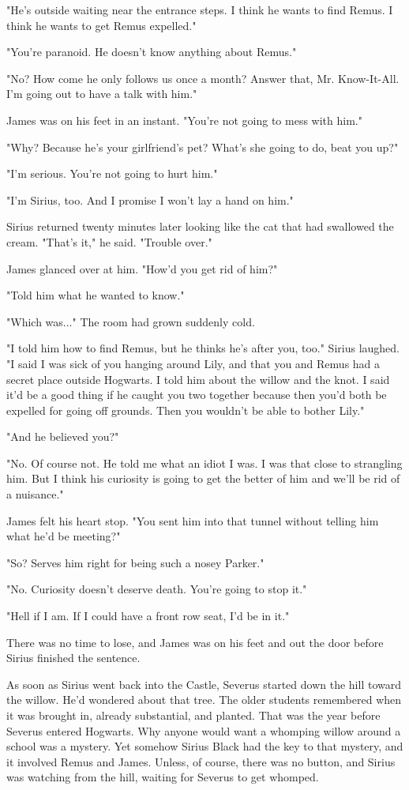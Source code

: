 \documentclass[a4paper,11pt]{article}
\begin{document}
"He's outside waiting near the entrance steps. I think he wants to find Remus. I think he wants to get Remus expelled."

"You're paranoid. He doesn't know anything about Remus."

"No? How come he only follows us once a month? Answer that, Mr. Know-It-All. I'm going out to have a talk with him."

James was on his feet in an instant. "You're not going to mess with him."

"Why? Because he's your girlfriend's pet? What's she going to do, beat you up?"

"I'm serious. You're not going to hurt him."

"I'm Sirius, too. And I promise I won't lay a hand on him."

Sirius returned twenty minutes later looking like the cat that had swallowed the cream. "That's it," he said. "Trouble over."

James glanced over at him. "How'd you get rid of him?"

"Told him what he wanted to know."

"Which was..." The room had grown suddenly cold.

"I told him how to find Remus, but he thinks he's after you, too." Sirius laughed. "I said I was sick of you hanging around Lily, and that you and Remus had a secret place outside Hogwarts. I told him about the willow and the knot. I said it'd be a good thing if he caught you two together because then you'd both be expelled for going off grounds. Then you wouldn't be able to bother Lily."

"And he believed you?"

"No. Of course not. He told me what an idiot I was. I was that close to strangling him. But I think his curiosity is going to get the better of him and we'll be rid of a nuisance."

James felt his heart stop. "You sent him into that tunnel without telling him what he'd be meeting?"

"So? Serves him right for being such a nosey Parker."

"No. Curiosity doesn't deserve death. You're going to stop it."

"Hell if I am. If I could have a front row seat, I'd be in it."

There was no time to lose, and James was on his feet and out the door before Sirius finished the sentence.

As soon as Sirius went back into the Castle, Severus started down the hill toward the willow. He'd wondered about that tree. The older students remembered when it was brought in, already substantial, and planted. That was the year before Severus entered Hogwarts. Why anyone would want a whomping willow around a school was a mystery. Yet somehow Sirius Black had the key to that mystery, and it involved Remus and James. Unless, of course, there was no button, and Sirius was watching from the hill, waiting for Severus to get whomped.
\end{document}
